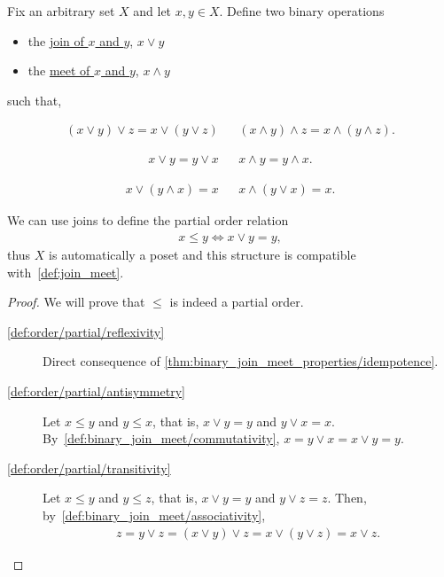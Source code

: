 \begin{definition}\label{def:binary_join_meet}
  Fix an arbitrary set $X$ and let $x, y \in X$. Define two binary operations
  \begin{itemize}
    \item the \uline{join of $x$ and $y$}, $x \lor y$
    \item the \uline{meet of $x$ and $y$}, $x \land y$
  \end{itemize}
  such that,
  \begin{description}
    \begin{align*}
      (x \lor y) \lor z = x \lor (y \lor z)
      &&
      (x \land y) \land z = x \land (y \land z).
    \end{align*}

    \begin{align*}
      x \lor y = y \lor x
      &&
      x \land y = y \land x.
    \end{align*}

    \begin{align*}
      x \lor (y \land x) = x
      &&
      x \land (y \lor x) = x.
    \end{align*}
  \end{description}

  We can use joins to define the partial order relation
  \begin{align*}
    x \leq y \iff x \lor y = y,
  \end{align*}
  thus $X$ is automatically a poset and this structure is compatible with~\cref{def:join_meet}.
\end{definition}
\begin{proof}
  We will prove that $\leq$ is indeed a partial order.
  \begin{description}
    \item[\ref{def:order/partial/reflexivity}] Direct consequence of \cref{thm:binary_join_meet_properties/idempotence}.
    \item[\ref{def:order/partial/antisymmetry}] Let $x \leq y$ and $y \leq x$, that is, $x \lor y = y$ and $y \lor x = x$. By~\ref{def:binary_join_meet/commutativity}, $x = y \lor x = x \lor y = y$.
    \item[\ref{def:order/partial/transitivity}] Let $x \leq y$ and $y \leq z$, that is, $x \lor y = y$ and $y \lor z = z$. Then, by~\ref{def:binary_join_meet/associativity},
    \begin{align*}
      z = y \lor z = (x \lor y) \lor z = x \lor (y \lor z) = x \lor z.
    \end{align*}
  \end{description}
\end{proof}

